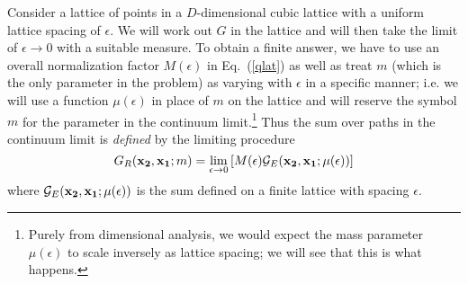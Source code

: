 \documentclass{article}
\def\eq#1{{Eq.~(\ref{#1})}}
\begin{document}
Consider a lattice of points in a $D$-dimensional cubic lattice with a uniform
lattice spacing of $\epsilon$. We will work out $G$ in the 
lattice and will then take the limit of $\epsilon\to 0$
with a suitable measure. To obtain a finite answer, we have to use an overall normalization factor $M(\epsilon)$ in \eq{qlat} as well as 
treat $m$ (which is the only parameter in the problem)
as varying with $\epsilon$  in a specific manner; i.e. we will use a function $\mu(\epsilon)$ in place of $m$ on the lattice
and will  reserve the symbol $m$  for the parameter in the continuum limit.\footnote{Purely from dimensional analysis, we would expect the mass parameter $\mu(\epsilon)$ to scale inversely as lattice spacing;  we will see that this is what happens.}  Thus the sum over paths in the continuum limit is \textit{defined} by the limiting procedure
\begin{equation} 
G_R(\mathbf{ x_2,x_1};m)=
\lim_{\epsilon\to 0}
\left[M(\epsilon){\cal G}_E(\mathbf{ x_2, x_1};
\mu(\epsilon))\right]  
\end{equation} 
where ${\cal G}_E(\mathbf{ x_2, x_1};\mu(\epsilon))$ is the sum defined on a finite lattice with spacing $\epsilon$.
\end{document}
